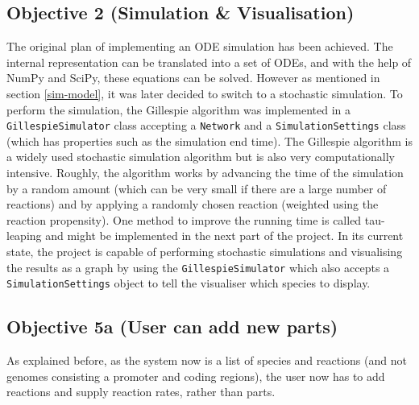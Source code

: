 \documentclass{article}
\begin{document}
	\subsection{Objective 2 (Simulation \& Visualisation)} 
	The original plan of implementing an ODE simulation has been achieved. The internal representation can be translated into a set of ODEs, and with the help of NumPy\cite{numpy} and SciPy\cite{scipy}, these equations can be solved. However as mentioned in section \ref{sim-model}, it was later decided to switch to a stochastic simulation. To perform the simulation, the Gillespie algorithm \cite{gillespie} was implemented in a \verb|GillespieSimulator| class accepting a \verb|Network| and a \verb|SimulationSettings| class (which has properties such as the simulation end time). The Gillespie algorithm is a widely used stochastic simulation algorithm but is also very computationally intensive. Roughly, the algorithm works by advancing the time of the simulation by a random amount (which can be very small if there are a large number of reactions) and by applying a randomly chosen reaction (weighted using the reaction propensity). One method to improve the running time is called tau-leaping and might be implemented in the next part of the project. In its current state, the project is capable of performing stochastic simulations and visualising the results as a graph by using the \verb|GillespieSimulator| which also accepts a \verb|SimulationSettings| object to tell the visualiser which species to display.
	
	\subsection{Objective 5a (User can add new parts)} 
	As explained before, as the system now is a list of species and reactions (and not genomes consisting a promoter and coding regions), the user now has to add reactions and supply reaction rates, rather than parts.
	
\end{document}
